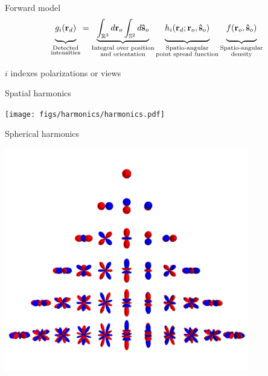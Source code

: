 \documentclass[presentation]{beamer}
\providecommand{\ro}[1]{\mathbf{r}_o}
\providecommand{\so}[1]{\mathbf{\hat{s}}_o}
\providecommand{\ro}[1]{\mathbf{\mathfrak{r}}_o}
\providecommand{\so}[1]{\mathbf{\hat{s}}_o}
\providecommand{\rd}[1]{\mathbf{r}_d}
\begin{document}
\begin{frame}{Forward model}
  \begin{align*}
    \underbrace{\vphantom{\int_{\mathbb{R}^3}}g_i(\rd{})}_{\substack{\text{Detected} \\ \text{intensities}}}
    =
    \underbrace{\int_{\mathbb{R}^3}d\ro{} \int_{\mathbb{S}^2}d\so{}}_{\substack{\text{Integral over position} \\ \text{and orientation}}}
    \underbrace{\vphantom{\int_{\mathbb{R}^3}}h_i(\rd{}; \ro{}, \so{})}_{\substack{\text{Spatio-angular}\\ \text{point spread function}}}
    \underbrace{\vphantom{\int_{\mathbb{R}^3}}f(\ro{}, \so{})}_{\substack{\text{Spatio-angular}\\ \text{density}}}
  \end{align*}
  \begin{center}
    \vspace{1em}
    \small{$i$ indexes polarizations or views}
  \end{center}
\end{frame}

\begin{frame}[label=sec-1]{Spatial harmonics}
 \begin{center}
   \texttt{[image: figs/harmonics/harmonics.pdf]}
 \end{center}
\end{frame}

\begin{frame}[label=sec-1]{Spherical harmonics}
 \begin{center}
   \includegraphics[width=0.8\textwidth]{figs/sph_harm.png}
 \end{center}
\end{frame}
\end{document}

